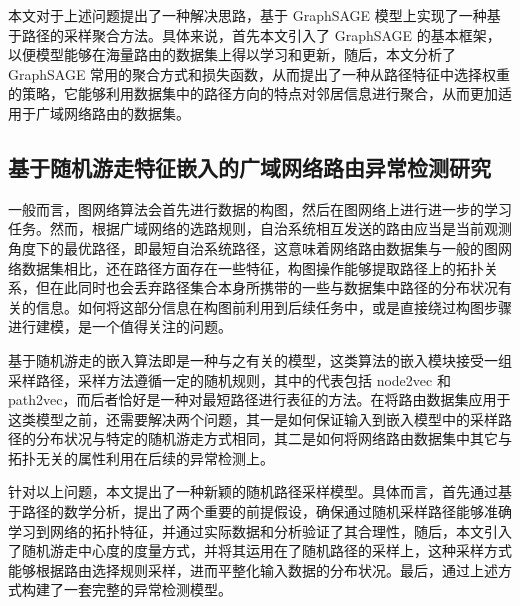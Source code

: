 本文对于上述问题提出了一种解决思路，基于 GraphSAGE 模型上实现了一种基于路径的采样聚合方法。具体来说，首先本文引入了 GraphSAGE 的基本框架，以便模型能够在海量路由的数据集上得以学习和更新，随后，本文分析了 GraphSAGE 常用的聚合方式和损失函数，从而提出了一种从路径特征中选择权重的策略，它能够利用数据集中的路径方向的特点对邻居信息进行聚合，从而更加适用于广域网络路由的数据集。

\subsection{基于随机游走特征嵌入的广域网络路由异常检测研究}

一般而言，图网络算法会首先进行数据的构图，然后在图网络上进行进一步的学习任务。然而，根据广域网络的选路规则，自治系统相互发送的路由应当是当前观测角度下的最优路径，即最短自治系统路径，这意味着网络路由数据集与一般的图网络数据集相比，还在路径方面存在一些特征，构图操作能够提取路径上的拓扑关系，但在此同时也会丢弃路径集合本身所携带的一些与数据集中路径的分布状况有关的信息。如何将这部分信息在构图前利用到后续任务中，或是直接绕过构图步骤进行建模，是一个值得关注的问题。

基于随机游走的嵌入算法即是一种与之有关的模型，这类算法的嵌入模块接受一组采样路径，采样方法遵循一定的随机规则，其中的代表包括 node2vec 和 path2vec，而后者恰好是一种对最短路径进行表征的方法。在将路由数据集应用于这类模型之前，还需要解决两个问题，其一是如何保证输入到嵌入模型中的采样路径的分布状况与特定的随机游走方式相同，其二是如何将网络路由数据集中其它与拓扑无关的属性利用在后续的异常检测上。

针对以上问题，本文提出了一种新颖的随机路径采样模型。具体而言，首先通过基于路径的数学分析，提出了两个重要的前提假设，确保通过随机采样路径能够准确学习到网络的拓扑特征，并通过实际数据和分析验证了其合理性，随后，本文引入了随机游走中心度的度量方式，并将其运用在了随机路径的采样上，这种采样方式能够根据路由选择规则采样，进而平整化输入数据的分布状况。最后，通过上述方式构建了一套完整的异常检测模型。